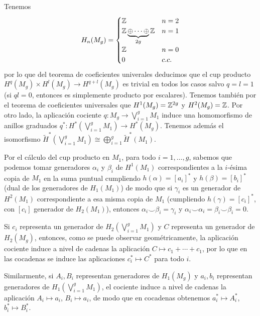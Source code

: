 \documentclass[twoside]{article}
\begin{document}
\begin{solucion}

Tenemos 
\[
H_n(M_g)=\begin{cases}
\mathbb{Z} & n=2\\
\mathbb{Z}\underbrace{\oplus\cdots\oplus}_{2g}\mathbb{Z} & n=1\\
\mathbb{Z} & n=0\\
0 & c.c.
\end{cases}
\]
por lo que del teorema de coeficientes univerales deducimos que el cup producto $H^q(M_g)\times H^l(M_g)\to H^{q+l}(M_g)$ es trivial en todos los casos salvo $q=l=1$ (si $ql=0$, entonces es simplemente producto por escalares). Tenemos también por el teorema de coeficientes universales que $H^1(M_g)=\mathbb{Z}^{2g}$ y $H^2(M_g)=\mathbb{Z}$. Por otro lado, la aplicación cociente $q:M_g\to\bigvee_{i=1}^g M_1$ induce una homomorfismo de anillos graduados $q^*:H^*(\bigvee_{i=1}^g M_1)\to H^*(M_g)$. Tenemos además el isomorfismo $\widetilde{H}^*(\bigvee_{i=1}^g M_1)\cong\bigoplus_{i=1}^g \widetilde{H}^*(M_1)$. 

Por el cálculo del cup producto en $M_1$, para todo $i=1,\dots, g$, sabemos que podemos tomar generadores $\alpha_i$ y $\beta_i$ de $H^1(M_1)$ correspondientes a la $i$-ésima copia de $M_1$ en la suma puntual cumpliendo $h(\alpha)=[a_i]^*$ y $h(\beta)=[b_i]^*$ (dual de los generadores de $H_1(M_1)$) de modo que si $\gamma_i$ es un generador de $H^2(M_1)$ correspondiente a esa misma copia de $M_1$ (cumpliendo $h(\gamma)=[c_i]^*$, con $[c_i]$ generador de $H_2(M_1)$), entonces $\alpha_i\smile \beta_i=\gamma_i$ y $\alpha_i\smile \alpha_i=\beta_i\smile \beta_i=0$. 

Si $c_i$ representa un generador de $H_2(\bigvee_{i=1}^g M_1)$ y $C$ representa un generador de $H_2(M_g)$, entonces, como se puede observar geométricamente, la aplicación cociente induce a nivel de cadenas la aplicación $C\mapsto c_1+\cdots+c_1$, por lo que en las cocadenas se induce las aplicaciones $c_i^*\mapsto C^*$ para todo $i$. 

Similarmente, si $A_i,B_i$ representan generadores de $H_1(M_g)$ y $a_i,b_i$ representan generadores de $H_1(\bigvee_{i=1}^g M_1)$, el cociente induce a nivel de cadenas la aplicación $A_i\mapsto a_i$, $B_i\mapsto a_i$, de modo que en cocadenas obtenemos $a_i^*\mapsto A_i^*$, $b_i^*\mapsto B_i^*$. 


\end{solucion}
\end{document}

